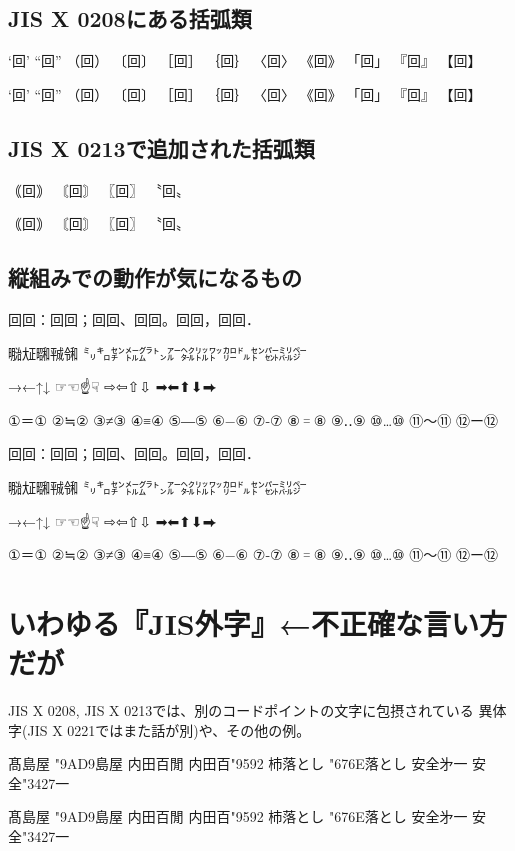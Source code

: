 \documentclass[landscape]{utarticle}
\begin{document}
\subsection{JIS X 0208にある括弧類}
‘回’ “回” （回） 〔回〕 ［回］ ｛回｝ 〈回〉 《回》 「回」 『回』 【回】

{\gt
‘回’ “回” （回） 〔回〕 ［回］ ｛回｝ 〈回〉 《回》 「回」 『回』 【回】
}


\subsection{JIS X 0213で追加された括弧類}
｟回｠ 〘回〙 〖回〗 〝回〟

{\gt
｟回｠ 〘回〙 〖回〗 〝回〟
}


\subsection{縦組みでの動作が気になるもの}
回回：回回；回回、回回。回回，回回．

㍾㍽㍼㍻㋿ ㍉㌔㌢㍍㌘㌧㌃㌶㍑㍗㌍㌦㌣㌫㍊㌻

→←↑↓ ☞☜☝☟ ⇨⇦⇧⇩ ➡⬅⬆⬇⮕

①＝① ②≒② ③≠③ ④≡④ ⑤―⑤ ⑥−⑥ ⑦‐⑦ ⑧゠⑧ ⑨‥⑨ ⑩…⑩ ⑪〜⑪ ⑫ー⑫

{\gt
回回：回回；回回、回回。回回，回回．

㍾㍽㍼㍻㋿ ㍉㌔㌢㍍㌘㌧㌃㌶㍑㍗㌍㌦㌣㌫㍊㌻

→←↑↓ ☞☜☝☟ ⇨⇦⇧⇩ ➡⬅⬆⬇⮕

①＝① ②≒② ③≠③ ④≡④ ⑤―⑤ ⑥−⑥ ⑦‐⑦ ⑧゠⑧ ⑨‥⑨ ⑩…⑩ ⑪〜⑪ ⑫ー⑫
}


\section{いわゆる『JIS外字』←不正確な言い方だが}
JIS X 0208, JIS X 0213では、別のコードポイントの文字に包摂されている
異体字(JIS X 0221ではまた話が別)や、その他の例。

髙島屋 \char"9AD9島屋\quad%
内田百閒 内田百\char"9592\quad%
杮落とし \char"676E落とし\quad%
安全﻿㐧一 安全\char"3427一\quad%

{\gt
髙島屋 \char"9AD9島屋\quad%
内田百閒 内田百\char"9592\quad%
杮落とし \char"676E落とし\quad%
安全﻿㐧一 安全\char"3427一\quad%
}
\end{document}
